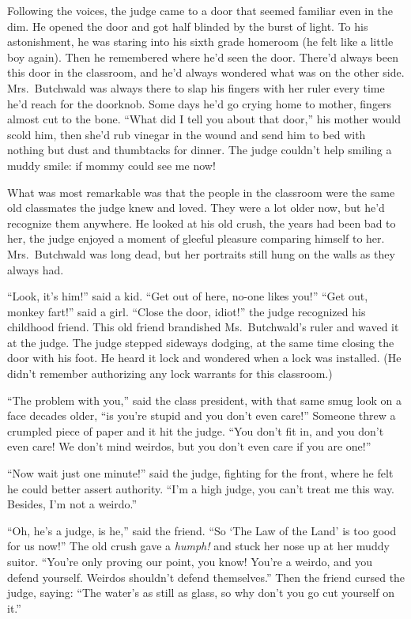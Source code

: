 \documentclass[oneside]{book}
\begin{document}
Following the voices, the judge came to a door that seemed familiar even in the
dim.  He opened the door and got half blinded by the burst of light.  To his astonishment,
he was staring into his sixth grade homeroom (he felt like a little boy again).
Then he remembered where he'd seen the door.
There'd always been this door in the classroom, and he'd always wondered what was on the
other side.  Mrs.~Butchwald was always there to slap his fingers with her ruler every time
he'd reach for the doorknob.  Some days he'd go crying home to mother, fingers almost cut
to the bone.  ``What did I tell you about that door,'' his mother would scold him, then 
she'd rub vinegar in the wound and send him to bed with nothing but dust and thumbtacks
for dinner.  The judge couldn't help smiling a muddy smile:  if mommy could see me now!

What was most remarkable was that the people in the classroom were the same old classmates
the judge knew and loved.  They were a lot older now, but he'd recognize them anywhere.
He looked at his old crush, the years had been bad to her, the judge enjoyed a moment of
gleeful pleasure comparing himself to her.  Mrs.~Butchwald was long dead, but her portraits
still hung on the walls as they always had.

``Look, it's him!'' said a kid.  ``Get out of here, no-one likes you!''  ``Get out, monkey fart!''
said a girl.  ``Close the door, idiot!'' the judge recognized his childhood friend.  This old
friend brandished Ms.~Butchwald's ruler and waved it at the judge.  The judge stepped sideways
dodging, at the same time closing the door with his foot.  He heard it lock and wondered
when a lock was installed.  (He didn't remember authorizing any lock warrants for this classroom.)

``The problem with you,'' said the class president, with that same smug look on a face decades
older, ``is you're stupid and you don't even care!''  Someone threw a crumpled piece of paper and
it hit the judge.  ``You don't fit in, and you don't even care!  We don't mind weirdos, but
you don't even care if you are one!''

``Now wait just one minute!'' said the judge, fighting for the front, where he
felt he could better assert authority.  ``I'm a high judge, you can't treat me this way.  Besides,
I'm not a weirdo.''

``Oh, he's a judge, is he,'' said the friend.  ``So `The Law of the Land' is too good for us now!''
The old crush gave a \emph{humph!} and stuck her nose up at her muddy suitor.  ``You're only
proving our point, you know!  You're a weirdo, and you defend yourself.  Weirdos shouldn't
defend themselves.''  Then the friend cursed the judge, saying: ``The water's as still as glass, so why don't
you go cut yourself on it.''
\end{document}
